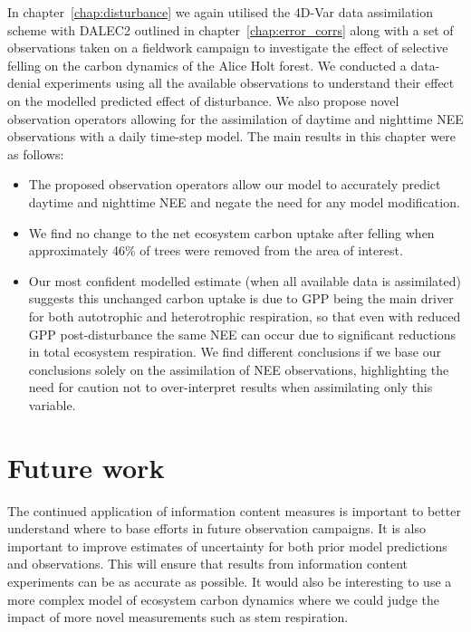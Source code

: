 In chapter~\ref{chap:disturbance} we again utilised the 4D-Var data assimilation scheme with DALEC2 outlined in chapter~\ref{chap:error_corrs} along with a set of observations taken on a fieldwork campaign to investigate the effect of selective felling on the carbon dynamics of the Alice Holt forest. We conducted a data-denial experiments using all the available observations to understand their effect on the modelled predicted effect of disturbance. We also propose novel observation operators allowing for the assimilation of daytime and nighttime NEE observations with a daily time-step model. The main results in this chapter were as follows:
\begin{itemize}
\item The proposed observation operators allow our model to accurately predict daytime and nighttime NEE and negate the need for any model modification. 
\item We find no change to the net ecosystem carbon uptake after felling when approximately 46\% of trees were removed from the area of interest.
\item Our most confident modelled estimate (when all available data is assimilated) suggests this unchanged carbon uptake is due to GPP being the main driver for both autotrophic and heterotrophic respiration, so that even with reduced GPP post-disturbance the same NEE can occur due to significant reductions in total ecosystem respiration. We find different conclusions if we base our conclusions solely on the assimilation of NEE observations, highlighting the need for caution not to over-interpret results when assimilating only this variable. 
\end{itemize}

\section{Future work}

The continued application of information content measures is important to better understand where to base efforts in future observation campaigns. It is also important to improve estimates of uncertainty for both prior model predictions and observations. This will ensure that results from information content experiments can be as accurate as possible. It would also be interesting to use a more complex model of ecosystem carbon dynamics where we could judge the impact of more novel measurements such as stem respiration.

